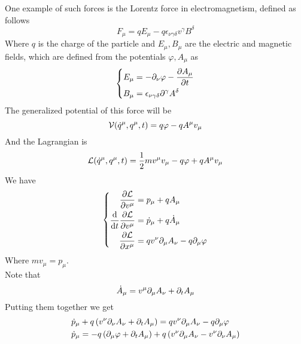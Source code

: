 \documentclass[../admech.tex]{subfiles}
\begin{document}
\begin{eg}
	One example of such forces is the Lorentz force in electromagnetism, defined as follows
	\begin{equation}
		F_\mu=qE_\mu-q\epsilon_{\nu\gamma\delta}v^\gamma B^\delta
		\label{eq:lorentzforce}
	\end{equation}
	Where $q$ is the charge of the particle and $E_\mu,B_\mu$ are the electric and magnetic fields, which are defined from the potentials $\varphi,A_\mu$ as
	\begin{equation}
		\left\{ \begin{aligned}
				E_\mu&=-\partial_\nu\varphi-\pdv{A_\mu}{t}\\
				B_\mu&=\epsilon_{\nu\gamma\delta}\partial^\gamma A^\delta
		\end{aligned}\right.
		\label{eq:ebaphi}
	\end{equation}
	The generalized potential of this force will be
	\begin{equation}
		\mathcal{V}(\dot{q}^\mu,q^\mu,t)=q\varphi-qA^\mu v_\mu
		\label{eq:lorentzvpot}
	\end{equation}
	And the Lagrangian is
	\begin{equation}
		\mathcal{L}(\dot{q}^\mu,q^\mu,t)=\frac{1}{2}mv^\mu v_\mu-q\varphi+qA^\mu v_\mu
		\label{eq:lagrangianem}
	\end{equation}
	We have
	\begin{equation*}
		\left\{ \begin{aligned}
				\pdv{\mathcal{L}}{v^\mu}&=p_\mu+qA_\mu\\
				\dv{t}\pdv{\mathcal{L}}{v^\mu}&=\dot{p}_\mu+q\dot{A}_\mu\\
				\pdv{\mathcal{L}}{x^\mu}&=qv^\nu\partial_\mu A_\nu-q\partial_\mu\varphi
		\end{aligned}\right.
		\label{eq:lagder}
	\end{equation*}
	Where $mv_\mu=p_\mu$.\\
	Note that
	\begin{equation*}
		\dot{A}_\mu=v^\mu\partial_\mu A_\nu+\partial_tA_\mu
	\end{equation*}
	Putting them together we get
	\begin{equation}
		\begin{aligned}
			\dot{p}_\mu&+q\left( v^\nu\del_\nu A_\nu+\del_tA_\mu \right)=qv^\nu\del_\mu A_\nu-q\del_\mu\varphi\\
			\dot{p}_\mu&=-q\left( \del_\mu\varphi+\del_tA_\mu \right)+q\left( v^\nu\del_\mu A_\nu-v^\nu\del_\nu A_\mu \right)
		\end{aligned}

\end{equation}
\end{eg}
\end{document}
